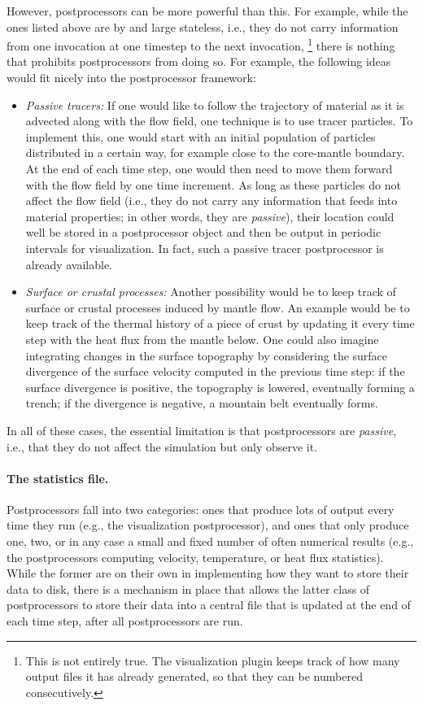 \documentclass{article}
\begin{document}
However, postprocessors can be more powerful than this. For example, while the
ones listed above are by and large stateless, i.e., they do not carry
information from one invocation at one timestep to the next invocation,%
\footnote{This is not entirely true. The visualization plugin keeps track of
  how many output files it has already generated, so that they can be numbered
  consecutively.}
there is nothing that prohibits postprocessors from doing so. For example, the
following ideas would fit nicely into the postprocessor framework:
\begin{itemize}
\item \textit{Passive tracers:} If one would like to follow the trajectory of
  material as it is advected along with the flow field, one technique is to
  use tracer particles. To implement this, one would start with an initial
  population of particles distributed in a certain way, for example close to
  the core-mantle boundary. At the end of each time step, one would then need
  to move them forward with the flow field by one time increment. As long as
  these particles do not affect the flow field (i.e., they do not carry any
  information that feeds into material properties; in other words, they are
  \textit{passive}), their location could well
  be stored in a postprocessor object and then be output in periodic intervals
  for visualization. In fact, such a passive tracer postprocessor is already
  available.

\item \textit{Surface or crustal processes:} Another possibility would be to keep track
  of surface or crustal processes induced by mantle flow. An example would be
  to keep track of the thermal history of a piece of crust by updating it
  every time step with the heat flux from the mantle below. One could also
  imagine integrating changes in the surface topography by considering the
  surface divergence of the surface velocity computed in the previous time
  step: if the surface divergence is positive, the topography is lowered,
  eventually forming a trench; if the divergence is negative, a mountain belt
  eventually forms.
\end{itemize}
In all of these cases, the essential limitation is that postprocessors are
\textit{passive}, i.e., that they do not affect the simulation but only
observe it.

\paragraph{The statistics file.}
Postprocessors fall into two categories: ones that produce lots of output
every time they run (e.g., the visualization postprocessor), and ones that
only produce one, two, or in any case a small and fixed number of often
numerical results (e.g., the postprocessors computing velocity, temperature,
or heat flux statistics). While the former are on their own in implementing
how they want to store their data to disk, there is a mechanism in place that
allows the latter class of postprocessors to store their data into a central
file that is updated at the end of each time step, after all postprocessors
are run.
\end{document}
